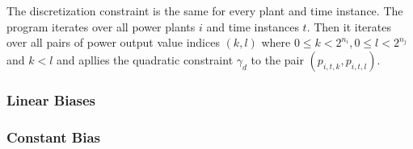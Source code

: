 The discretization constraint is the same for every plant and time instance.
The program iterates over all power plants $i$ and time instances $t$.
Then it iterates over all pairs of power output value indices $(k, l)$ where $0 \leq k < 2^{n_i}, 0 \leq l < 2^{n_j}$ and $k < l$ and apllies the quadratic constraint $\gamma_d$ to the pair $(p_{i, t, k}, p_{i, t, l})$.

\subsubsection{Linear Biases}


\subsubsection{Constant Bias}

